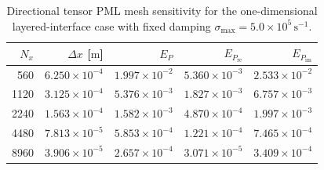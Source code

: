 \begin{table}[H]
    \centering
    \caption{Directional tensor PML mesh sensitivity for the one-dimensional layered-interface case with fixed damping $\sigma_{\max}=5.0\times10^5\,\mathrm{s^{-1}}$.}
    \label{tab:pmlMeshSensitivity}
    \begin{tabular}{rrrrr}
        \toprule
        $N_x$ & $\Delta x$ [$\mathrm{m}$] & $E_P$ & $E_{P_{\mathrm{re}}}$ & $E_{P_{\mathrm{im}}}$ \\
        \midrule
        560 & $6.250\times 10^{-4}$ & $1.997\times 10^{-2}$ & $5.360\times 10^{-3}$ & $2.533\times 10^{-2}$ \\
        1120 & $3.125\times 10^{-4}$ & $5.376\times 10^{-3}$ & $1.827\times 10^{-3}$ & $6.757\times 10^{-3}$ \\
        2240 & $1.563\times 10^{-4}$ & $1.582\times 10^{-3}$ & $4.870\times 10^{-4}$ & $1.997\times 10^{-3}$ \\
        4480 & $7.813\times 10^{-5}$ & $5.853\times 10^{-4}$ & $1.221\times 10^{-4}$ & $7.465\times 10^{-4}$ \\
        8960 & $3.906\times 10^{-5}$ & $2.657\times 10^{-4}$ & $3.071\times 10^{-5}$ & $3.409\times 10^{-4}$ \\
        \bottomrule
    \end{tabular}
\end{table}
